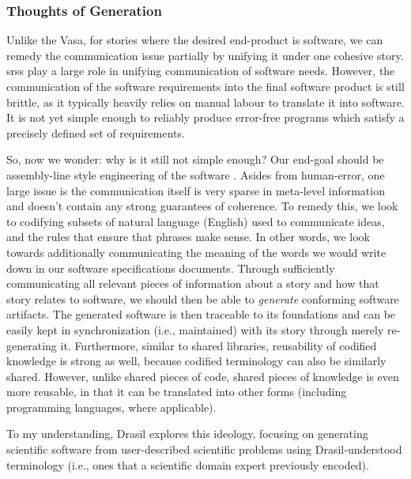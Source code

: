 \subsubsection{Thoughts of Generation}

Unlike the Vasa, for stories where the desired end-product is software, we can
remedy the communication issue partially by unifying it under one cohesive
story. \Aclp{srs} play a large role in unifying communication of software needs.
However, the communication of the software requirements into the final software
product is still brittle, as it typically heavily relies on manual labour to
translate it into software. It is not yet simple enough to reliably produce
error-free programs which satisfy a precisely defined set of requirements.

So, now we wonder: why is it still not simple enough? Our end-goal should be
assembly-line style engineering of the software \cite{well-understood}. Asides
from human-error, one large issue is the communication itself is very sparse in
meta-level information and doesn't contain any strong guarantees of coherence.
To remedy this, we look to codifying subsets of natural language (English) used
to communicate ideas, and the rules that ensure that phrases make sense. In
other words, we look towards additionally communicating the meaning of the words
we would write down in our software specifications documents. Through
sufficiently communicating all relevant pieces of information about a story and
how that story relates to software, we should then be able to \textit{generate}
conforming software artifacts. The generated software is then traceable to its
foundations and can be easily kept in synchronization (i.e., maintained) with
its story through merely re-generating it. Furthermore, similar to shared
libraries, reusability of codified knowledge is strong as well, because codified
terminology can also be similarly shared. However, unlike shared pieces of code,
shared pieces of knowledge is even more reusable, in that it can be translated
into other forms (including programming languages, where applicable).

To my understanding, Drasil \cite{Drasil2021} explores this ideology, focusing
on generating scientific software from user-described scientific problems using
Drasil-understood terminology (i.e., ones that a scientific domain expert
previously encoded).
